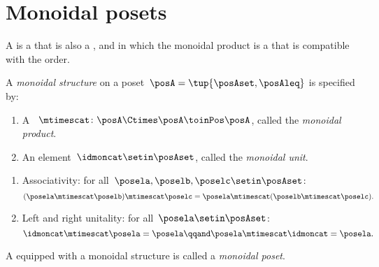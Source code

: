 
\section{Monoidal posets}
\label{sec:monoidal-posets}

A  is a  that is also a , and in which the monoidal product is a  that is compatible with the order.

\begin{ctdefinition}
    \label{def:monoidal-poset}
    A \emph{monoidal structure} on a poset~$\posA = \tup{\posAset, \posAleq}$ is specified by:

    \constit
    \begin{enumerate}
        \item A ~$\mtimescat \colon \posA \Ctimes \posA \toinPos \posA$, called the \emph{monoidal product}.
        \item An element~$\idmoncat \setin \posAset$, called the \emph{monoidal unit}.
    \end{enumerate}

    \condit
    \begin{enumerate}
        \item Associativity: for all~$\posela, \poselb, \poselc \setin \posAset$:
              \begin{equation}
                  (\posela \mtimescat \poselb)
                  \mtimescat \poselc =  \posela  \mtimescat ( \poselb \mtimescat \poselc).
              \end{equation}
        \item Left and right unitality: for all~$\posela \setin \posAset$:
              \begin{equation}
                  \idmoncat \mtimescat \posela = \posela
                  \qqand
                  \posela \mtimescat \idmoncat = \posela.
              \end{equation}
    \end{enumerate}

    \noindent A  equipped with a monoidal structure is called a \emph{monoidal poset}.
\end{ctdefinition}

